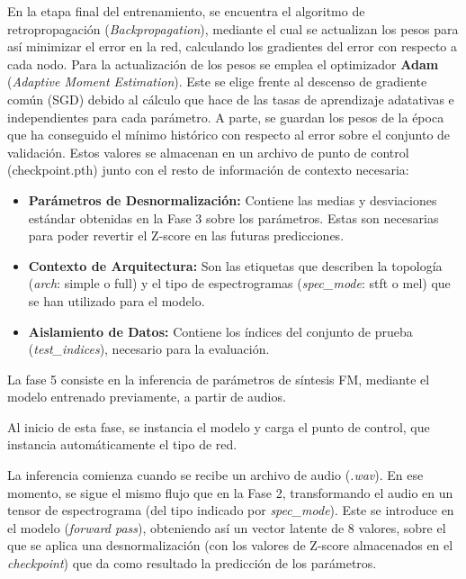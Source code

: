 \documentclass[12pt, a4paper]{article}
\begin{document}
En la etapa final del entrenamiento, se encuentra el algoritmo de retropropagación (\textit{Backpropagation}), mediante el cual se actualizan
los pesos para así minimizar el error en la red, calculando los gradientes del error con respecto a cada nodo. 
Para la actualización de los pesos se emplea el optimizador \textbf{Adam} (\textit{Adaptive Moment Estimation}). Este se elige frente al descenso de gradiente común (SGD) debido al cálculo que hace 
de las tasas de aprendizaje adatativas e independientes para cada parámetro. A parte, se guardan los pesos de la época que ha conseguido 
el mínimo histórico con respecto al error sobre el conjunto de validación. Estos valores se almacenan en un archivo de punto de control (checkpoint.pth) junto
con el resto de información de contexto necesaria: 

\begin{itemize}
        \item \textbf{Parámetros de Desnormalización: } Contiene las medias y desviaciones estándar obtenidas en la Fase 3
        sobre los parámetros. Estas son necesarias para poder revertir el Z-score en las futuras predicciones. 
          
        \item \textbf{Contexto de Arquitectura: } Son las etiquetas que describen la topología (\textit{arch}: simple o full)
        y el tipo de espectrogramas (\textit{spec\_mode}: stft o mel) que se han utilizado para el modelo.
        
        \item \textbf{Aislamiento de Datos: } Contiene los índices del conjunto de prueba (\textit{test\_indices}), necesario para la evaluación.
        

\end{itemize}

La fase 5 consiste en la inferencia de parámetros de síntesis FM, mediante el modelo entrenado previamente, a partir
de audios. 

Al inicio de esta fase, se instancia el modelo y carga el punto de control, que instancia automáticamente
el tipo de red. 

La inferencia comienza cuando se recibe un archivo de audio (\textit{.wav}). En ese momento, se sigue el mismo flujo
que en la Fase 2, transformando el audio en un tensor de espectrograma (del tipo indicado por \textit{spec\_mode}). Este 
se introduce en el modelo (\textit{forward pass}), obteniendo así un vector latente de 8 valores, sobre el que se aplica
una desnormalización (con los valores de Z-score almacenados en el \textit{checkpoint}) que da como resultado la predicción de 
los parámetros. 
\end{document}
